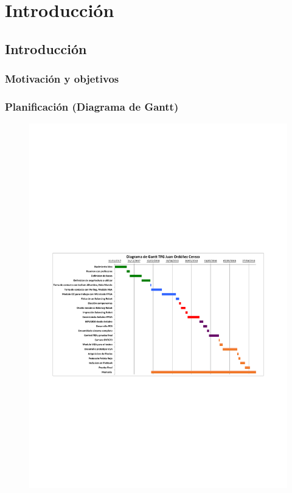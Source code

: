 \chapter{Introducción}\label{sec:intro}

\section{Introducción}
\subsection{Motivación y objetivos}
\newpage
\subsection{Planificación (Diagrama de Gantt)}
\begin{center}
	\begin{figure}[H]
		\center
		\includegraphics[trim = 15mm 85mm 0mm 100mm,clip, angle=-90, scale = 1.4]{imagenes/Introduction/Gantt.pdf}
		\label{fig:diagramaGantt}
	\end{figure}
\end{center}
